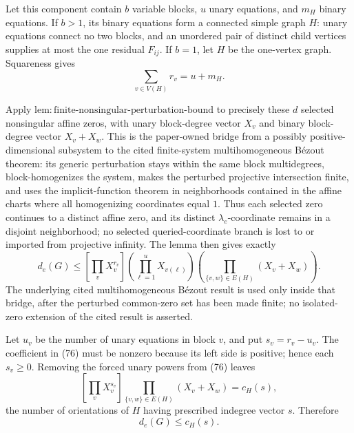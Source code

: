 Let this component contain \(b\) variable blocks, \(u\) unary equations, and \(m_H\) binary equations.  If \(b>1\), its binary equations form a connected simple graph \(H\): unary equations connect no two blocks, and an unordered pair of distinct child vertices supplies at most the one residual \(F_{ij}\).  If \(b=1\), let \(H\) be the one-vertex graph.  Squareness gives
\[
 \sum_{v\in V(H)}r_v=u+m_H.
\tag{75}
\]

Apply \(\mathrm{lem:finite\mbox{-}nonsingular\mbox{-}perturbation\mbox{-}bound}\) to precisely these \(d\) selected nonsingular affine zeros, with unary block-degree vector \(X_v\) and binary block-degree vector \(X_v+X_w\).  This is the paper-owned bridge from a possibly positive-dimensional subsystem to the cited finite-system multihomogeneous B\'ezout theorem: its generic perturbation stays within the same block multidegrees, block-homogenizes the system, makes the perturbed projective intersection finite, and uses the implicit-function theorem in neighborhoods contained in the affine charts where all homogenizing coordinates equal \(1\).  Thus each selected zero continues to a distinct affine zero, and its distinct \(\lambda_e\)-coordinate remains in a disjoint neighborhood; no selected queried-coordinate branch is lost to or imported from projective infinity.  The lemma then gives exactly
\[
 d_e(G)\leq
 [\prod_vX_v^{r_v}]
 \left(\prod_{\ell=1}^{u}X_{v(\ell)}\right)
 \left(\prod_{\{v,w\}\in E(H)}(X_v+X_w)\right).
\tag{76}
\]
The underlying cited multihomogeneous B\'ezout result is used only inside that bridge, after the perturbed common-zero set has been made finite; no isolated-zero extension of the cited result is asserted.

Let \(u_v\) be the number of unary equations in block \(v\), and put \(s_v=r_v-u_v\).  The coefficient in (76) must be nonzero because its left side is positive; hence each \(s_v\geq0\).  Removing the forced unary powers from (76) leaves
\[
 [\prod_vX_v^{s_v}]\prod_{\{v,w\}\in E(H)}(X_v+X_w)=c_H(s),
\tag{77}
\]
the number of orientations of \(H\) having prescribed indegree vector \(s\).  Therefore
\[
 d_e(G)\leq c_H(s).
\tag{78}
\]

